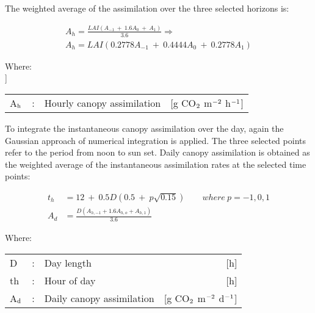 The weighted average of the assimilation over the three selected horizons is: 

\begin{align*}
A_{h} = \frac{LAI(A_{-1} ~+~1.6A _{0} ~+~A _{1} )}{3.6} \Rightarrow   \nonumber  \\
A_{h} = LAI(0.2778A_{-1} ~+~0.4444A_{0} ~+~0.2778A_{1} )
\end{align*}

Where:\\[5pt]]
\begin{tabularx}{\textwidth}{llXr}   
A$_{{\rm h}}$ &:& Hourly canopy assimilation & [g CO$_{{\rm 2}}$ m$^{{\rm -2}}$ h$^{{\rm -1}}$]\\
\end{tabularx}

To integrate the instantaneous canopy assimilation over the day, again the Gaussian
approach of numerical integration is applied. The three selected points refer to the period
from noon to sun set. Daily canopy assimilation is obtained as the weighted average of the
instantaneous assimilation rates at the selected time points:

\begin{align*}
t_{h} &= 12 ~+~ 0.5D(0.5~+~p \sqrt{0.15} ) \qquad where \ p =-1,0,1 \\
A_{d} &= \frac{D(A_{h,-1} + 1.6A_{h,o} + A_{h,1})}{3.6}
\end{align*}

Where:\\[5pt]
\begin{tabularx}{\textwidth}{lcXr}
D &:& Day length     &    [h]\\
th &:& Hour of day   &     [h]\\
A$_{{\rm d}}$ &:& Daily canopy assimilation    & 
    [g CO$_{{\rm 2}}$ m$^{{\rm -2}}$ d$^{{\rm -1}}$]\\
\end{tabularx}